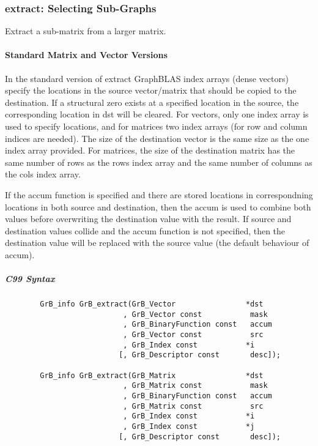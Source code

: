 \subsubsection{{\sf extract}: Selecting Sub-Graphs}

Extract a sub-matrix from a larger matrix. 

\paragraph{Standard Matrix and Vector Versions}

In the standard version of {\sf extract} GraphBLAS index arrays (dense vectors)
specify the locations in the source vector/matrix that should be copied to the
destination.  If a structural zero exists at a specified location in the source,
the corresponding location in dst will be cleared.  For vectors, only one index array is used to specify
locations, and for matrices two index arrays (for row and column indices are needed).
The size of the destination vector is the same size as the one index array provided.
For matrices, the size of the destination matrix has the same number of rows as the
{\sf rows} index array and the same number of columns as the {\sf cols} index array.

If the {\sf accum} function is specified and there are stored locations in correspondning
locations in both source and destination, then the
{\sf accum} is used to combine both values before overwriting the destination value
with the result.  If source and destination values collide and the {\sf accum} function is
not specified, then the destination value will be replaced with the source value (the
default behaviour of {\sf accum}).

\subparagraph{C99 Syntax}

\begin{verbatim}
        GrB_info GrB_extract(GrB_Vector                *dst
                           , GrB_Vector const           mask
                           , GrB_BinaryFunction const   accum
                           , GrB_Vector const           src
                           , GrB_Index const           *i
                          [, GrB_Descriptor const       desc]);
                  
        GrB_info GrB_extract(GrB_Matrix                *dst
                           , GrB_Matrix const           mask
                           , GrB_BinaryFunction const   accum
                           , GrB_Matrix const           src
                           , GrB_Index const           *i
                           , GrB_Index const           *j
                          [, GrB_Descriptor const       desc]);
\end{verbatim}


